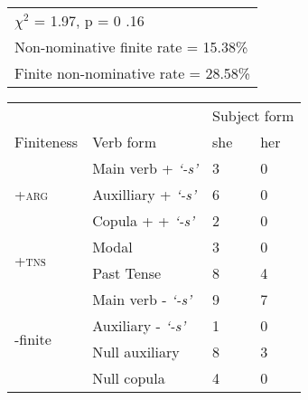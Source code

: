 \begin{table}[!h]
\begin{minipage}[t]{0.5\textwidth}
\begin{tabular}{@{}lll@{}}
        \hline
        \multicolumn{3}{l}{$\chi^2$ = 1.97, p = 0 .16} \\
 \multicolumn{3}{l}{Non-nominative finite rate = 15.38\%} \\
\multicolumn{3}{l}{Finite non-nominative rate = 28.58\%}\\
        \bottomrule
    \end{tabular}
    \end{minipage}
\begin{minipage}[t]{0.5\textwidth}
    \centering
    \small
 \begin{tabular}{llll}
\toprule
 &  & \multicolumn{2}{l}{Subject form} \\ \cline{3-4} 
Finiteness & Verb form & she & her \\ \hline
\multirow{3}{*}{\textsc{+arg}} & Main verb + \textit{`-s'} & 3 & 0 \\
 & Auxilliary + \textit{`-s'} & 6 & 0 \\
 & Copula + + \textit{`-s'} & 2 & 0 \\ \hline
\multirow{2}{*}{\textsc{+tns}} & Modal & 3 & 0 \\
 & Past Tense & 8 & 4 \\ \hline
\multirow{4}{*}{-finite} & Main verb - \textit{`-s'} & 9 & 7 \\
 & Auxiliary - \textit{`-s'} & 1 & 0 \\
 & Null auxiliary & 8 & 3 \\
 & Null copula & 4 & 0\\
 \bottomrule
\end{tabular}
\end{minipage}
\end{table}
\FloatBarrier

